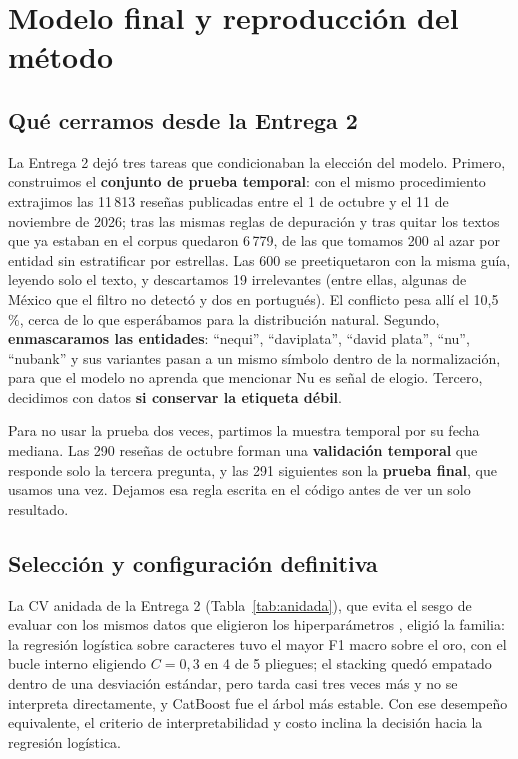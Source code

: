 \documentclass[11pt,a4paper]{article}
\begin{document}
\section{Modelo final y reproducción del método}

\subsection{Qué cerramos desde la Entrega 2}
La Entrega 2 dejó tres tareas que condicionaban la elección del modelo. Primero, construimos el
\textbf{conjunto de prueba temporal}: con el mismo procedimiento extrajimos las 11\,813 reseñas
publicadas entre el 1 de octubre y el 11 de noviembre de 2026; tras las mismas reglas de depuración
y tras quitar los textos que ya estaban en el corpus quedaron 6\,779, de las que tomamos 200 al azar
por entidad sin estratificar por estrellas. Las 600 se preetiquetaron con la misma guía, leyendo
solo el texto, y descartamos 19 irrelevantes (entre ellas, algunas de México que el filtro no detectó y dos en portugués). El
conflicto pesa allí el 10,5\,\%, cerca de lo que esperábamos para la distribución natural. Segundo,
\textbf{enmascaramos las entidades}: ``nequi'', ``daviplata'', ``david plata'', ``nu'', ``nubank''
y sus variantes pasan a un mismo símbolo dentro de la normalización, para que el modelo no aprenda
que mencionar Nu es señal de elogio. Tercero, decidimos con datos \textbf{si conservar la etiqueta
débil}.

Para no usar la prueba dos veces, partimos la muestra temporal por su fecha mediana. Las 290 reseñas
de octubre forman una \textbf{validación temporal} que responde solo la tercera pregunta, y las 291
siguientes son la \textbf{prueba final}, que usamos una vez. Dejamos esa regla escrita en el código
antes de ver un solo resultado.

\subsection{Selección y configuración definitiva}
La CV anidada de la Entrega 2 (Tabla~\ref{tab:anidada}), que evita el sesgo de evaluar con los mismos
datos que eligieron los hiperparámetros \cite{cawley}, eligió la familia: la regresión logística
sobre caracteres tuvo el mayor F1 macro sobre el oro, con el bucle interno eligiendo $C=0{,}3$ en 4
de 5 pliegues; el stacking quedó empatado dentro de una desviación estándar, pero tarda casi tres
veces más y no se interpreta directamente, y CatBoost fue el árbol más estable. Con ese desempeño
equivalente, el criterio de interpretabilidad y costo inclina la decisión hacia la regresión
logística.
\end{document}
